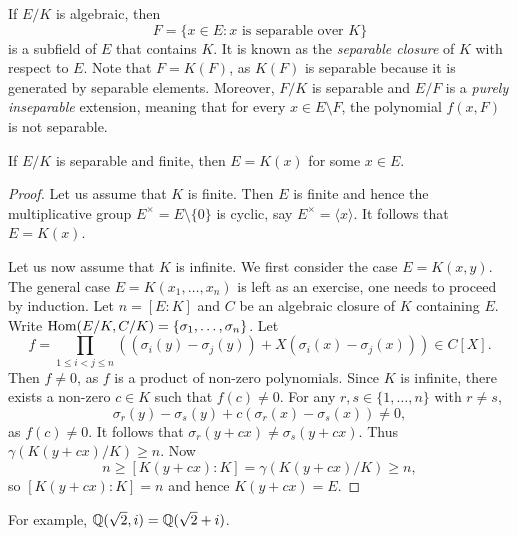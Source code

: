 
\label{separable}
If $E/K$ is algebraic, then 
\[
    F=\{x\in E:x\text{ is separable over }K\}
\]
is a subfield of $E$ that contains $K$. It is known as 
the \emph{separable closure} of $K$ with respect to $E$. 
Note that $F=K(F)$, as
$K(F)$ is separable because it is generated by separable elements. Moreover, 
$F/K$ is separable and 
$E/F$ is a \emph{purely inseparable} extension, meaning that
for every $x\in E\setminus F$, the polynomial $f(x,F)$ is not separable. 

\begin{proposition}
\label{pro:monogenic}
    If $E/K$ is separable and finite, then $E=K(x)$ for some $x\in E$. 
\end{proposition}

\begin{proof}
    Let us assume that $K$ is finite. Then $E$ is finite and hence 
    the multiplicative group $E^{\times}=E\setminus\{0\}$ 
    is cyclic, say $E^{\times}=\langle x\rangle$. It follows
    that $E=K(x)$. 
    
    Let us now assume that $K$ is infinite. We first consider the case 
    $E=K(x,y)$. The general case $E=K(x_1,\dots,x_n)$ is left as an exercise, one needs to proceed by induction. 
    Let $n=[E:K]$ and 
    $C$ be an algebraic closure of $K$ containing $E$. 
    Write $\operatorname{Hom}(E/K,C/K)=\{\sigma_1,\dots,\sigma_n\}$. Let 
    \[
    f=\prod_{1\leq i<j\leq n}\left((\sigma_i(y)-\sigma_j(y))
    +X(\sigma_i(x)-\sigma_j(x))\right)\in C[X].
    \]
    Then $f\ne 0$, as $f$ is a product of non-zero polynomials. Since $K$ is infinite, 
    there exists a non-zero 
    $c\in K$ such that $f(c)\ne 0$. For any $r,s\in\{1,\dots,n\}$ with 
    $r\ne s$,
    \[
        \sigma_r(y)-\sigma_s(y)+c(\sigma_r(x)-\sigma_s(x))\ne 0,
    \]
    as $f(c)\ne0$. It follows that $\sigma_r(y+cx)\ne\sigma_s(y+cx)$. Thus $\gamma(K(y+cx)/K)\geq n$. 
    Now 
    \[
    n\geq [K(y+cx):K]=\gamma(K(y+cx)/K)\geq n,
    \]
    so $[K(y+cx):K]=n$ and
    hence $K(y+cx)=E$. 
\end{proof}

For example, $\mathbb{Q}(\sqrt{2},i)=\mathbb{Q}(\sqrt{2}+i)$. 

